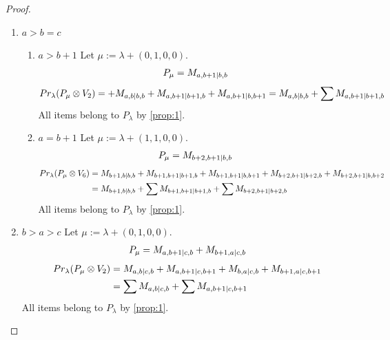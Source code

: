 \documentclass[12pt,a4paper]{article}
\begin{document}
\begin{proof}
\begin{enumerate}
  \item $a>b=c$
    \begin{enumerate}
      \item $a>b+1$
        Let $\mu:=\lambda + (0,1,0,0) $. 
\begin{equation}\notag
  \begin{aligned}
      P_{\mu} = M_{a,b+1|b,b}
  \end{aligned}
\end{equation}
\begin{equation}\notag
  \begin{aligned}
    Pr_{\lambda}(P_\mu \otimes V_2) =
+M_{a,b|b,b}
+M_{a,b+1|b+1,b}
+M_{a,b+1|b,b+1} 
= M_{a,b|b,b}
+\sum M_{a,b+1|b+1,b}
  \end{aligned}
\end{equation}
All items belong to $P_\lambda$ by \cref{prop:1}.

      \item $a=b+1$
        Let $\mu:=\lambda + (1,1,0,0) $. 
\begin{equation}\notag
  \begin{aligned}
      P_{\mu} = M_{b+2,b+1|b,b}
  \end{aligned}
\end{equation}
\begin{equation}\notag
  \begin{aligned}
    Pr_{\lambda}(P_\mu \otimes V_6) &=
M_{b+1,b|b,b}
+M_{b+1,b+1|b+1,b}
+M_{b+1,b+1|b,b+1}
+M_{b+2,b+1|b+2,b}
+M_{b+2,b+1|b,b+2} \\
                                    &= 
 M_{b+1,b|b,b}
+\sum M_{b+1,b+1|b+1,b}
+\sum M_{b+2,b+1|b+2,b}
  \end{aligned}
\end{equation}
All items belong to $P_\lambda$ by \cref{prop:1}.
    \end{enumerate}

  \item $b>a>c$
        Let $\mu:=\lambda + (0,1,0,0) $. 
\begin{equation}\notag
  \begin{aligned}
      P_{\mu} = 
M_{a,b+1|c,b}
+M_{b+1,a|c,b}
  \end{aligned}
\end{equation}
\begin{equation}\notag
  \begin{aligned}
    Pr_{\lambda}(P_\mu \otimes V_2) &=
M_{a,b|c,b}
+M_{a,b+1|c,b+1}
+M_{b,a|c,b}
+M_{b+1,a|c,b+1} \\
                                    &=
\sum M_{a,b|c,b}
+\sum M_{a,b+1|c,b+1}
  \end{aligned}
\end{equation}
All items belong to $P_\lambda$ by \cref{prop:1}.


\end{enumerate}
\end{proof}
\end{document}
